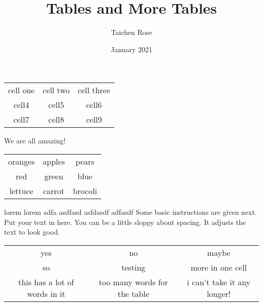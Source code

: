                                                                                                                                                                                                                                                                                                                                                                                                                                                                                                                                                                                                                                                                                                                                                                                                                                                                                                                                                                                                                                                                                  \documentclass{article}
\title{Tables and More Tables}
\author{Taichen Rose}
\date{January 2021}
\begin{document}
\maketitle
\begin{center}
\begin{tabular}{ c c c }
 cell one & cell two & cell three \\ 
 cell4 & cell5 & cell6 \\  
 cell7 & cell8 & cell9    
\end{tabular}
\end{center}

We are all amazing!

\begin{center}
\begin{tabular}{ |c|c|c| } 
 \hline
 oranges & apples & pears \\ 
 red & green & blue \\ 
 lettuce & carrot & brocoli \\ 
 \hline
\end{tabular}
\end{center}

lorem lorem adfa asdfasd asfdasdf adfasdf 
\medskip
Some basic instructions are given next.
Put your text in here.  You can be a little sloppy    about
spacing.  It adjusts the text to look good.

\begin{center}
\begin{tabular}{ |c|c|c| } 
 \hline
 yes & no & maybe \\ 
 so & testing & more in one cell \\ 
 this has a lot of words in it & too many words for the table & i can't take it any longer! \\ 
 \hline
\end{tabular}
\end{center}
\end{document}
